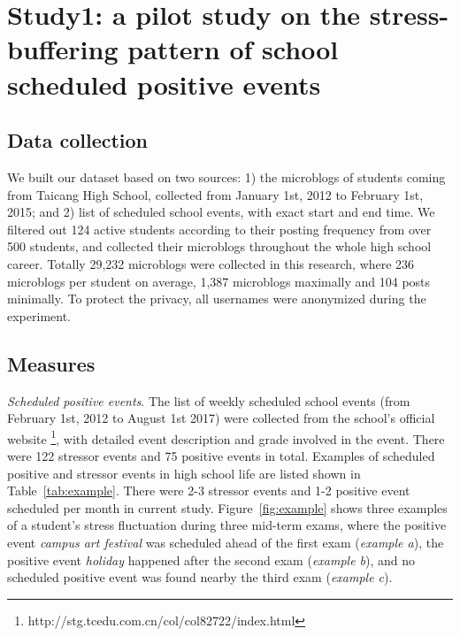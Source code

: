 \section{Study1: a pilot study on the stress-buffering pattern of school scheduled positive events}
\label{sec:study1}
\subsection{Data collection}
We built our dataset based on two sources: 1) the microblogs of students coming from Taicang High School,
collected from January 1st, 2012 to February 1st, 2015;
and 2) list of scheduled school events, with exact start and end time.
We filtered out 124 active students according to their posting frequency from over 500 students,
and collected their microblogs throughout the whole high school career.
Totally 29,232 microblogs were collected in this research,
where 236 microblogs per student on average, 1,387 microblogs maximally and 104 posts minimally.
To protect the privacy, all usernames were anonymized during the experiment.

\begin{table}[H]
\caption{\small{Examples of school scheduled positive and stressor events.}}
\label{tab:example}
\end{table}

\subsection{Measures}
\emph{Scheduled positive events}.
The list of weekly scheduled school events (from February 1st, 2012 to August 1st 2017) were collected from the school's official website
\footnote{http://stg.tcedu.com.cn/col/col82722/index.html},
with detailed event description and grade involved in the event.
There were 122 stressor events and 75 positive events in total.
Examples of scheduled positive and stressor events in high school life are listed shown in Table~\ref{tab:example}.
There were 2-3 stressor events and 1-2 positive event scheduled per month in current study.
Figure~\ref{fig:example} shows three examples of a student's stress fluctuation during three mid-term exams,
where the positive event \emph{campus art festival} was scheduled ahead of the first exam (\emph{example a}),
the positive event \emph{holiday} happened after the second exam (\emph{example b}),
and no scheduled positive event was found nearby the third exam (\emph{example c}).

